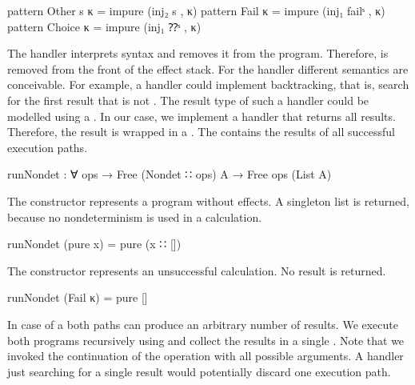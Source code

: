 \begin{code}
pattern Other s κ  = impure (inj₂ s , κ)
pattern Fail κ     = impure (inj₁ failˢ , κ)
pattern Choice κ   = impure (inj₁ ⁇ˢ , κ)
\end{code}
\begin{AgdaAlign}
  The handler interprets  syntax and removes it from the
  program.
  Therefore,  is removed from the front of the effect stack.
  For the handler different semantics are conceivable.
  For example, a handler could implement backtracking, that is, search for the
  first result that is not .
  The result type of such a handler could be modelled using a
  .
  In our case, we implement a handler that returns all results.
  Therefore, the result is wrapped in a .
  The  contains the results of all successful execution
  paths.
  \begin{code}
runNondet : ∀ {ops} → Free (Nondet ∷ ops) A → Free ops (List A)
  \end{code}
  The  constructor represents a program without
  effects.
  A singleton list is returned, because no nondeterminism is used in a
   calculation.
  \begin{code}
runNondet (pure x)     = pure (x ∷ [])
  \end{code}
  The  constructor represents an unsuccessful
  calculation.
  No result is returned.
  \begin{code}
runNondet (Fail κ)     = pure []
  \end{code}
  In case of a  both paths can produce an
  arbitrary number of results.
  We execute both programs recursively using  and
  collect the results in a single .
  Note that we invoked the continuation of the operation with all possible
  arguments.
  A handler just searching for a single result would potentially discard one
  execution path.


\end{AgdaAlign}
